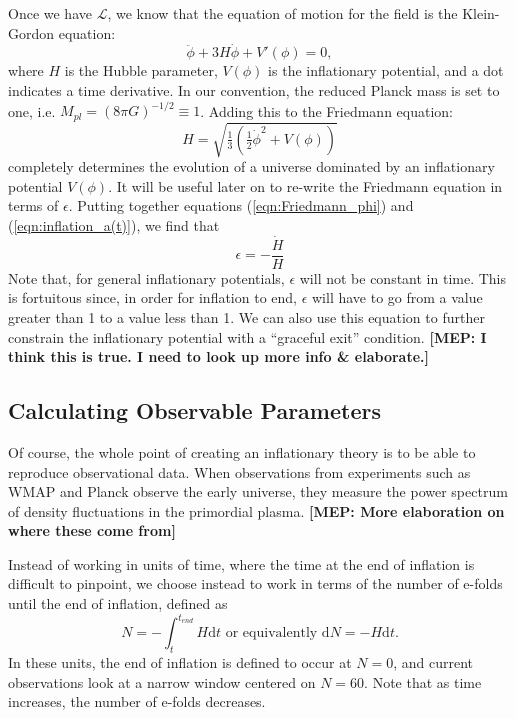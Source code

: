 \documentclass[onecolumn,apj]{emulateapj}
\def\d{\mathrm{d}}
\def\L{\mathscr{L}}
\def\half{\tfrac{1}{2}}
\newcommand{\mep}[1]{{\color{applegreen} \textbf{[MEP:  #1]}}}
\begin{document}
Once we have $\L$, we know that the equation of motion for the field is the Klein-Gordon equation:
\begin{equation}
\ddot \phi + 3H \dot \phi + V'(\phi) = 0,
\label{eqn:KG}
\end{equation}
where $H$ is the Hubble parameter, $V(\phi)$ is the inflationary potential, and a dot indicates a time derivative. In our convention, the reduced Planck mass is set to one, i.e. $M_{pl} = (8\pi G)^{-1/2} \equiv 1$. Adding this to the Friedmann equation: 
\begin{equation}
H = \sqrt{\tfrac{1}{3} \left ( \half \dot \phi^2 + V(\phi) \right )}
\label{eqn:Friedmann}
\end{equation}
completely determines the evolution of a universe dominated by an inflationary potential $V(\phi)$. It will be useful later on to re-write the Friedmann equation in terms of $\epsilon$. Putting together equations (\ref{eqn:Friedmann_phi}) and (\ref{eqn:inflation_a(t)}), we find that
\begin{equation}
\epsilon = -\frac{\dot H}{H}
\label{eqn:Friedmann_epsilon}
\end{equation}
Note that, for general inflationary potentials, $\epsilon$ will not be constant in time. This is fortuitous since, in order for inflation to end, $\epsilon$ will have to go from a value greater than 1 to a value less than 1. We can also use this equation to further constrain the inflationary potential with a ``graceful exit'' condition. \mep{I think this is true. I need to look up more info \& elaborate.}

\subsection{Calculating Observable Parameters}
Of course, the whole point of creating an inflationary theory is to be able to reproduce observational data. When observations from experiments such as WMAP and Planck observe the early universe, they measure the power spectrum of density fluctuations in the primordial plasma. \mep{More elaboration on where these come from}

Instead of working in units of time, where the time at the end of inflation is difficult to pinpoint, we choose instead to work in terms of the number of e-folds until the end of inflation, defined as 
\begin{equation}
N = -\int_t^{t_{end}} H \d t \text{\ \ \ or\ equivalently\ \ \ } \d N = -H \d t. 
\label{eqn:defN}
\end{equation}
In these units, the end of inflation is defined to occur at $N=0$, and current observations look at a narrow window centered on $N=60$. Note that as time increases, the number of e-folds decreases. 
\end{document}
